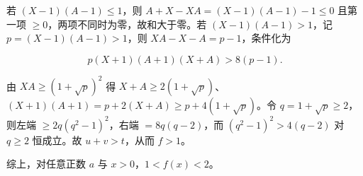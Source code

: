 \begin{answer}
若 $(X-1)(A-1)\leqslant1$，则 $A+X-XA=(X-1)(A-1)-1\leqslant0$ 且第一项 $\geqslant0$，两项不同时为零，故和大于零。若 $(X-1)(A-1)>1$，记 $p=(X-1)(A-1)>1$，则 $XA-X-A=p-1$，条件化为

\nopagebreak[4]
\[p(X+1)(A+1)(X+A)>8(p-1).\]

由 $XA\geqslant(1+\sqrt p)^2$ 得 $X+A\geqslant2(1+\sqrt p)$、$(X+1)(A+1)=p+2(X+A)\geqslant p+4(1+\sqrt p)$。令 $q=1+\sqrt p\geqslant2$，则左端 $\geqslant2q(q^2-1)^2$，右端 $=8q(q-2)$，而 $(q^2-1)^2>4(q-2)$ 对 $q\geqslant2$ 恒成立。故 $u+v>t$，从而 $f>1$。

综上，对任意正数 $a$ 与 $x>0$，$1<f(x)<2$。


\end{answer}
